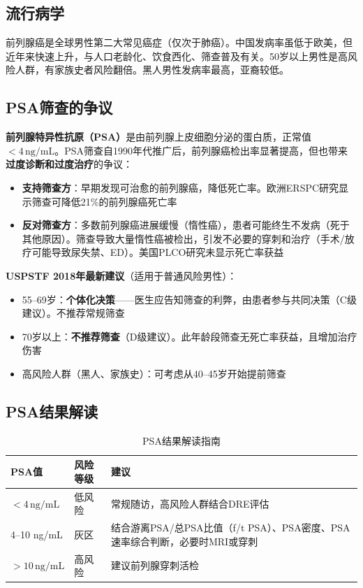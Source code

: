 \begin{enumerate}
\subsection{流行病学}

前列腺癌是全球男性第二大常见癌症（仅次于肺癌）。中国发病率虽低于欧美，但近年来快速上升，与人口老龄化、饮食西化、筛查普及有关。50岁以上男性是高风险人群，有家族史者风险翻倍。黑人男性发病率最高，亚裔较低。

\subsection{PSA筛查的争议}

\textbf{前列腺特异性抗原（PSA）}是由前列腺上皮细胞分泌的蛋白质，正常值$<4\,\mathrm{ng/mL}$。PSA筛查自1990年代推广后，前列腺癌检出率显著提高，但也带来\textbf{过度诊断和过度治疗}的争议：

\begin{itemize}[leftmargin=2cm]
	\item \textbf{支持筛查方}：早期发现可治愈的前列腺癌，降低死亡率。欧洲ERSPC研究显示筛查可降低21\%的前列腺癌死亡率
	\item \textbf{反对筛查方}：多数前列腺癌进展缓慢（惰性癌），患者可能终生不发病（死于其他原因）。筛查导致大量惰性癌被检出，引发不必要的穿刺和治疗（手术/放疗可能导致尿失禁、ED）。美国PLCO研究未显示死亡率获益
\end{itemize}

\textbf{USPSTF 2018年最新建议}（适用于普通风险男性）：
\begin{itemize}[leftmargin=2cm]
	\item 55--69岁：\textbf{个体化决策}——医生应告知筛查的利弊，由患者参与共同决策（C级建议）。不推荐常规筛查
	\item 70岁以上：\textbf{不推荐筛查}（D级建议）。此年龄段筛查无死亡率获益，且增加治疗伤害
	\item 高风险人群（黑人、家族史）：可考虑从40--45岁开始提前筛查
\end{itemize}

\subsection{PSA结果解读}

\begin{table}[htbp]
\centering
\caption{PSA结果解读指南}
\label{tab:psa_interpretation}
\begin{tabularx}{\textwidth}{@{}llX@{}}
    \toprule
    \textbf{PSA值} & \textbf{风险等级} & \textbf{建议} \\
    \midrule
    $<4\,\mathrm{ng/mL}$ & 低风险 & 常规随访，高风险人群结合DRE评估 \\
    4--10 ng/mL & 灰区 & 结合游离PSA/总PSA比值（f/t PSA）、PSA密度、PSA速率综合判断，必要时MRI或穿刺 \\
    $>10\,\mathrm{ng/mL}$ & 高风险 & 建议前列腺穿刺活检 \\
    \bottomrule
\end{tabularx}
\end{table}


\end{enumerate}
